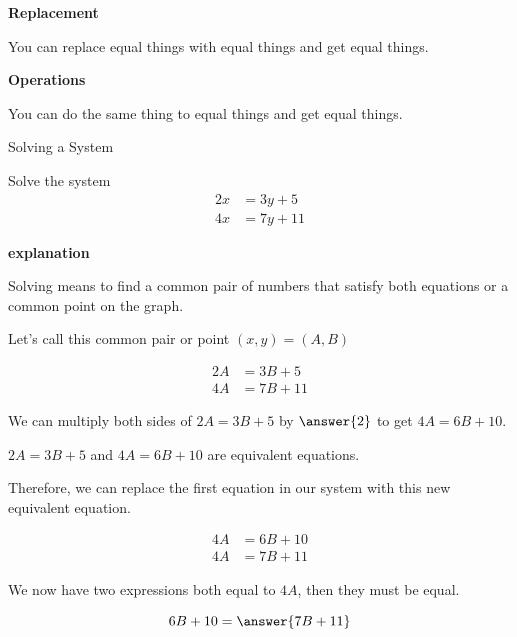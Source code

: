 \documentclass{ximera}
\begin{document}
\begin{fact} \textbf{\textcolor{red!75!green}{Replacement}} 

You can replace equal things with equal things and get equal things.

\end{fact}


\begin{fact} \textbf{\textcolor{red!75!green}{Operations}} 

You can do the same thing to equal things and get equal things.

\end{fact}






\begin{example} Solving a System


Solve the system
\begin{align*}
2 x & = 3 y + 5 \\
4 x & = 7 y + 11
\end{align*}



\textbf{\textcolor{red!75!green}{explanation}} 

Solving means to find a common pair of numbers that satisfy both equations or a common point on the graph. 

Let's call this common pair or point $(x, y) = (A, B)$ 

\begin{align*}
2 A & = 3 B + 5 \\
4 A & = 7 B + 11
\end{align*}



We can multiply both sides of $2A = 3B + 5$ by $\answer{2}$ to get $4 A = 6 B + 10$.  

$2 A = 3 B + 5$ and $4 A = 6 B + 10$ are equivalent equations. 

Therefore, we can replace the first equation in our system with this new equivalent equation.



\begin{align*}
4 A & = 6 B + 10 \\
4 A & = 7 B + 11
\end{align*}


We now have two expressions both equal to $4A$, then they must be equal.


\[   6 B + 10 =  \answer{7 B + 11}   \]


\end{example}
\end{document}
